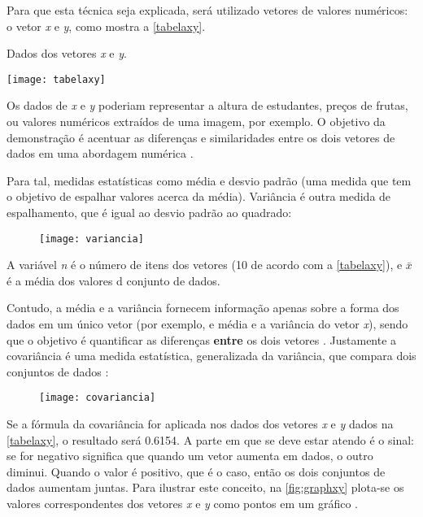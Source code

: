 Para que esta técnica seja explicada, será utilizado vetores de valores numéricos: o vetor \textit{x} e \textit{y}, como mostra a \autoref{tabelaxy}.

\begin{table}[h]
	\centering
	\caption{Dados dos vetores \textit{x} e \textit{y}.}
	\texttt{[image: tabelaxy]}
	\label{tabelaxy}
\end{table}

Os dados de \textit{x} e \textit{y} poderiam representar a altura de estudantes, preços de frutas, ou valores numéricos extraídos de uma imagem, por exemplo. O objetivo da demonstração é acentuar as diferenças e similaridades entre os dois vetores de dados em uma abordagem numérica \cite{drmathew_java_programming}. 

Para tal, medidas estatísticas como média e desvio padrão (uma medida que tem o objetivo de espalhar valores acerca da média). Variância é outra medida de espalhamento, que é igual ao desvio padrão ao quadrado:

\begin{figure}[h]
	\centering
	\texttt{[image: variancia]}
	\label{fig:variancia}
\end{figure}

A variável \textit{n} é o número de itens dos vetores (10 de acordo com a \autoref{tabelaxy}), e $\bar{x}$  é a média dos valores d conjunto de dados.

Contudo, a média e a variância fornecem informação apenas sobre a forma dos dados em um único vetor (por exemplo, e média e a variância do vetor \textit{x}), sendo que o objetivo é quantificar as diferenças \textbf{entre} os dois vetores \cite{drmathew_java_programming}.  Justamente a covariância é uma medida estatística, generalizada da variância, que compara dois conjuntos de dados \cite{drmathew_java_programming}:

\begin{figure}[h]
	\centering
	\texttt{[image: covariancia]}
	\label{fig:variancia}
\end{figure}

Se a fórmula da covariância for aplicada nos dados dos vetores \textit{x} e \textit{y} dados na \autoref{tabelaxy}, o resultado será 0.6154. A parte em que se deve estar atendo é o sinal: se for negativo significa que quando um vetor aumenta em dados, o outro diminui. Quando o valor é positivo, que é o caso, então os dois conjuntos de dados aumentam juntas. Para ilustrar este conceito, na \autoref{fig:graphxy} plota-se os valores correspondentes dos vetores \textit{x} e \textit{y} como pontos em um gráfico \cite{drmathew_java_programming}.


